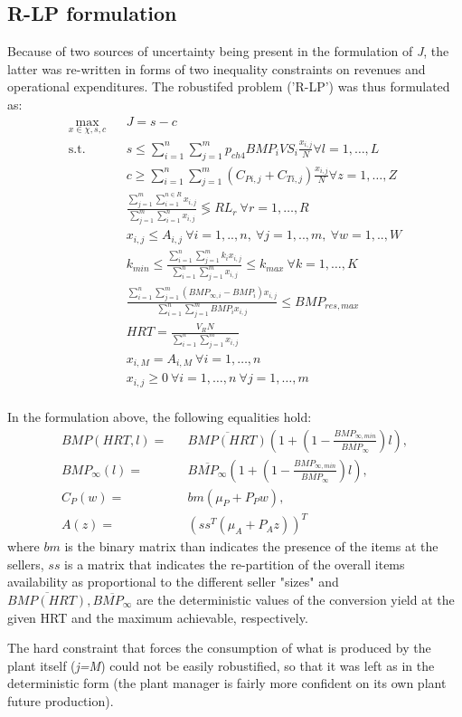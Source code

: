 \subsection{R-LP formulation}
Because of two sources of uncertainty being present in the formulation of \emph{J}, the latter was re-written in forms of two inequality constraints on revenues and operational expenditures.
The robustifed problem ('R-LP') was thus formulated as:
\begin{eqnarray*}
\max_{x\in\chi,s,c}&&J=s-c\\
\mbox{s.t.} && s \leq \sum_{i=1}^{n}\sum_{j=1}^{m} p_{ch4} BMP_{i} VS_{i} \frac{x_{i,j}}{N} \forall l=1,\dots,L\\
&& c \geq \sum_{i=1}^{n}\sum_{j=1}^{m} (C_{Pi,j} +C_{Ti,j})\frac{x_{i,j}}{N}\forall z=1,\dots,Z\\
&& \frac{\sum_{j=1}^{m}\sum_{i=1}^{n\in R} x_{i,j}}{\sum_{j=1}^{m}\sum_{i=1}^{n} x_{i,j}} \lessgtr RL_{r} \ \forall r=1,\dots,R\\
&& x_{i,j} \leq A_{i,j} \ \forall i=1,..,n,\ \forall j=1,..,m,\ \forall w=1,..,W\\
&& k_{min}\leq \frac{\sum_{i=1}^{n}\sum_{j=1}^{m} k_i x_{i,j}}{\sum_{i=1}^{n}\sum_{j=1}^{m} x_{i,j}}\leq k_{max}\ \forall k=1,\dots,K\,\\
&& \frac{\sum_{i=1}^{n}\sum_{j=1}^{m} (BMP_{\infty,i}-BMP_{i}) x_{i,j}}{\sum_{i=1}^{n}\sum_{j=1}^{m} BMP_{i} x_{i,j}}\leq BMP_{res,max}\\\
&& HRT = \frac{V_RN}{\sum_{i=1}^{n}\sum_{j=1}^{m} x_{i,j}}\\
&& x_{i,M} = A_{i,M}\ \forall i=1,\dots,n\\
&& x_{i,j}\geq 0\ \forall i=1,\dots,n\ \forall j=1,\dots,m\\
\end{eqnarray*}

In the formulation above, the following equalities hold:
\begin{eqnarray*}
BMP(HRT,l) = && \overline{BMP(HRT)}\left(1+\left(1-\frac{BMP_{\infty,min}}{\overline{BMP_{\infty}}}\right)l\right ),\\
BMP_{\infty}(l) = && \overline{BMP_\infty}\left(1+\left(1-\frac{BMP_{\infty,min}}{\overline{BMP_{\infty}}}\right)l\right ),\\
C_P(w) = && bm(\mu_{P} +P_{P} w),\\
A(z) = && (ss^T(\mu_A +P_A z))^T
\end{eqnarray*}
where $bm$ is the binary matrix than indicates the presence of the items at the sellers, $ss$ is a matrix that indicates the re-partition of the overall items availability as proportional to the different seller "sizes" and $\overline{BMP(HRT)}, \overline{BMP_{\infty}}$ are the deterministic values of the conversion yield at the given HRT and the maximum achievable, respectively.

The hard constraint that forces the consumption of what is produced by the plant itself (\emph{j=M}) could not be easily robustified, so that it was left as in the deterministic form (the plant manager is fairly more confident on its own plant future production).
